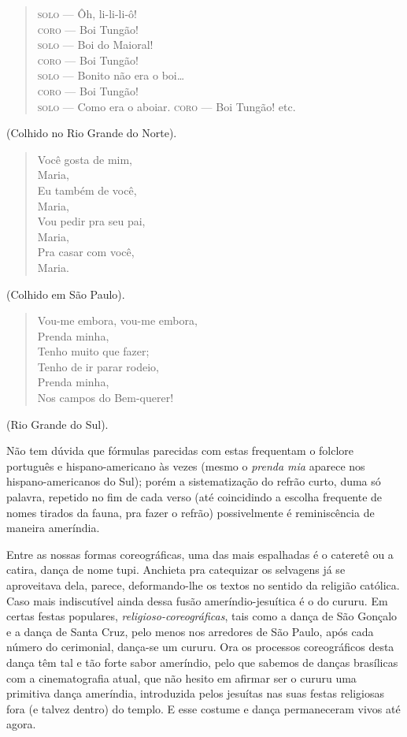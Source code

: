 \begin{verse}
\small{
\textsc{solo} --- Ôh, li-li-li-ô!\\
\textsc{coro} --- Boi Tungão!\\
\textsc{solo} --- Boi do Maioral!\\
\textsc{coro} --- Boi Tungão!\\
\textsc{solo} --- Bonito não era o boi\ldots{}\\
\textsc{coro} --- Boi Tungão!\\
\textsc{solo} --- Como era o aboiar. \textsc{coro} --- Boi Tungão! etc.}
\end{verse}

(Colhido no Rio Grande do Norte).

\begin{verse}
\small{
Você gosta de mim,\\
Maria,\\
Eu também de você,\\
Maria,\\
Vou pedir pra seu pai,\\
Maria,\\
Pra casar com você,\\
Maria.}
\end{verse}

(Colhido em São Paulo).

\begin{verse}
\small{
Vou-me embora, vou-me embora,\\
Prenda minha,\\
Tenho muito que fazer;\\
Tenho de ir parar rodeio,\\
Prenda minha,\\
Nos campos do Bem-querer!}
\end{verse}

(Rio Grande do Sul).

Não tem dúvida que fórmulas parecidas com estas frequentam o folclore
português e hispano-americano às vezes (mesmo o \textit{prenda mia} aparece
nos hispano-americanos do Sul); porém a sistematização do refrão curto,
duma só palavra, repetido no fim de cada verso (até coincidindo a
escolha frequente de nomes tirados da fauna, pra fazer o refrão)
possivelmente é reminiscência de maneira ameríndia.

Entre as nossas formas coreográficas, uma das mais espalhadas é o
cateretê ou a catira, dança de nome tupi. Anchieta pra catequizar os
selvagens já se aproveitava dela, parece, deformando-lhe os textos no
sentido da religião católica. Caso mais indiscutível ainda dessa fusão
ameríndio-jesuítica é o do cururu. Em certas festas populares,
\textit{religioso-coreográficas}, tais como a dança de São Gonçalo e a dança de
Santa Cruz, pelo menos nos arredores de São Paulo, após cada número do
cerimonial, dança-se um cururu. Ora os processos coreográficos desta
dança têm tal e tão forte sabor ameríndio, pelo que sabemos de danças
brasílicas com a cinematografia atual, que não hesito em afirmar ser o
cururu uma primitiva dança ameríndia, introduzida pelos jesuítas nas
suas festas religiosas fora (e talvez dentro) do templo. E esse costume
e dança permaneceram vivos até agora.

